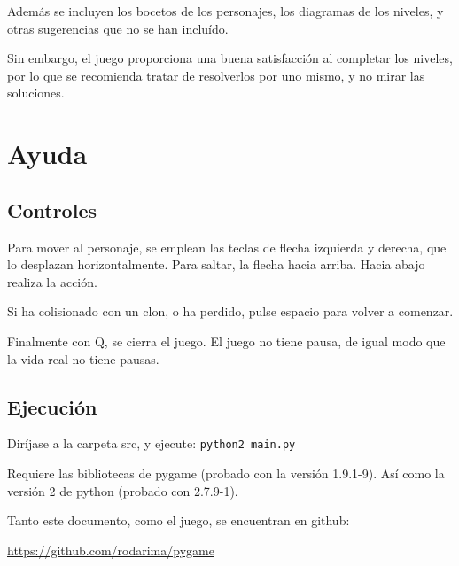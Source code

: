 \documentclass[11pt,a4paper]{article}
\begin{document}
Además se incluyen los bocetos de los personajes, los diagramas de los niveles, 
y otras sugerencias que no se han incluído.

Sin embargo, el juego proporciona una buena satisfacción al completar los 
niveles, por lo que se recomienda tratar de resolverlos por uno mismo, y no 
mirar las soluciones.

\section{Ayuda}

\subsection{Controles}
Para mover al personaje, se emplean las teclas de flecha izquierda y derecha, 
que lo desplazan horizontalmente. Para saltar, la flecha hacia arriba. Hacia 
abajo realiza la acción.

Si ha colisionado con un clon, o ha perdido, pulse espacio para volver a 
comenzar.

Finalmente con Q, se cierra el juego. El juego no tiene pausa, de igual modo que 
la vida real no tiene pausas.

\subsection{Ejecución}
Diríjase a la carpeta src, y ejecute: \texttt{python2 main.py}

Requiere las bibliotecas de pygame (probado con la versión 1.9.1-9). Así como la 
versión 2 de python (probado con 2.7.9-1).

Tanto este documento, como el juego, se encuentran en github:

\url{https://github.com/rodarima/pygame}
\end{document}

